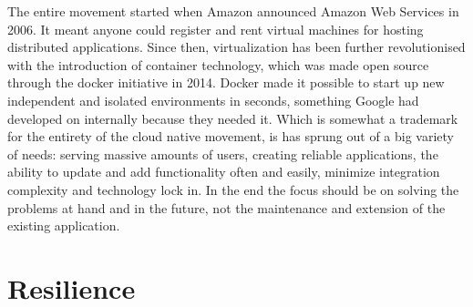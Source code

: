 The entire movement started when Amazon announced Amazon Web Services in 2006. It meant anyone could register and rent virtual machines for hosting distributed applications. Since then, virtualization has been further revolutionised with the introduction of container technology, which was made open source through the docker initiative in 2014. Docker made it possible to start up new independent and isolated environments in seconds, something Google had developed on internally because they needed it\cite{bernstein2014containers}. Which is somewhat a trademark for the entirety of the cloud native movement, is has sprung out of a big variety of needs: serving massive amounts of users, creating reliable applications, the ability to update and add functionality often and easily, minimize integration complexity and technology lock in. In the end the focus should be on solving the problems at hand and in the future, not the maintenance and extension of the existing application.


\section{Resilience}





\newpage
